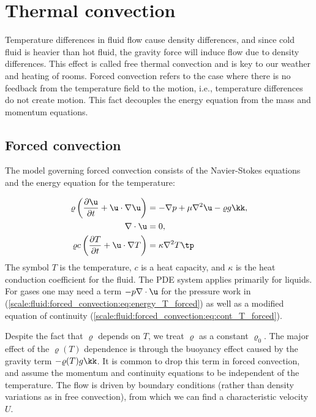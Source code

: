 \documentclass[graybox,envcountchap,sectrefs,final]{svmonodo}
\begin{document}
\section{Thermal convection}

Temperature differences in fluid flow cause density differences, and since
cold fluid is heavier than hot fluid, the gravity force will induce
flow due to density differences. This effect is called free thermal
convection and is key to our weather and heating of rooms.
Forced convection refers to the case where there is no
feedback from the temperature field to the motion, i.e., temperature
differences do not create motion. This fact decouples the energy
equation from the mass and momentum equations.

\subsection{Forced convection}


The model governing forced convection consists of the Navier-Stokes
equations and the energy equation for the temperature:

\begin{align}
\varrho\left(\frac{\partial \u}{\partial t} + \u\cdot\nabla\u\right)
&= -\nabla p + \mu\nabla^2\u - \varrho g\kk,
\label{scale:fluid:forced_convection:eq:momentum_T_forced}\\ 
\nabla\cdot\u & = 0,
\label{scale:fluid:forced_convection:eq:cont_T_forced}\\ 
\varrho c\left(\frac{\partial T}{\partial t} + \u\cdot\nabla T\right)
&= \kappa\nabla^2 T\tp
\label{scale:fluid:forced_convection:eq:energy_T_forced}
\end{align}
The symbol $T$ is the temperature, $c$ is a heat capacity, and $\kappa$
is the heat conduction coefficient for the fluid. The PDE system
applies primarily for liquids. For gases one may need a term
$- p\nabla\cdot\u$ for the pressure work in
(\ref{scale:fluid:forced_convection:eq:energy_T_forced})
as well as a modified equation of continuity
(\ref{scale:fluid:forced_convection:eq:cont_T_forced}).

Despite the fact that $\varrho$ depends on $T$, we treat $\varrho$
as a constant $\varrho_0$. The major effect of the $\varrho(T)$
dependence is through the
buoyancy effect caused by the gravity term $-\varrho(T)g\kk$.
It is common to drop this
term in forced convection,
and assume the momentum and continuity equations to be
independent of the temperature. The flow is driven by boundary
conditions (rather than density variations as in free convection),
from which we can find a characteristic velocity $U$.
\end{document}
